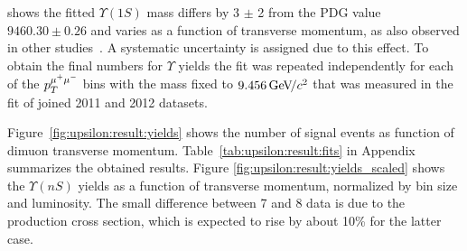 % 


 shows  the fitted $\Upsilon(1S)$
mass differs by 3 $\pm$ 2 \mevcc from the PDG value $9460.30 \pm  0.26$ \mevcc and
varies as a function of transverse momentum, as also observed in other
studies~\cite{Aaij:2013yaa}. A systematic uncertainty is assigned due to this
effect. To obtain the final numbers for $\Upsilon$ yields the fit was repeated
independently for each of the $p_T^{{\mu^+\mu^-}}$ bins with the \OneS mass fixed to
$9.456 {\mathrm{\,Ge\kern -0.1em V\!/}c^2}$ that was measured in the fit of joined 2011 and 2012 datasets.

Figure~\ref{fig:upsilon:result:yields} shows the number of signal events as
function of dimuon transverse momentum. Table~\ref{tab:upsilon:result:fits} in
Appendix summarizes the obtained results. Figure
\ref{fig:upsilon:result:yields_scaled} shows the $\Upsilon(nS)$ yields as a
function of transverse momentum, normalized by bin size and luminosity. The
small difference between 7 and 8 \tev data is due to the production cross
section, which is expected to rise by about 10\% for the latter case.




